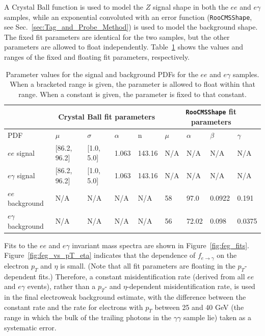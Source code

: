 \documentclass[dissertation.tex]{subfiles}
\begin{document}
A Crystal Ball function is used to model the $Z$ signal shape in both the $ee$ and $e\gamma$ samples, while an exponential convoluted with an error function (\verb+RooCMSShape+, see Sec.~\ref{sec:Tag_and_Probe_Method}) is used to model the background shape.  The fixed fit parameters are identical for the two samples, but the other parameters are allowed to float independently.  Table~\ref{tab:feg_fit_parameters} shows the values and ranges of the fixed and floating fit parameters, respectively.

\begin{table}[hcbp]
\caption{Parameter values for the signal and background PDFs for the $ee$ and $e\gamma$ samples.  When a bracketed range is given, the parameter is allowed to float within that range.  When a constant is given, the parameter is fixed to that constant.}
\centering
\begin{tabular}{|m{1.25cm}|m{1.25cm}|m{1.25cm}|m{1.25cm}|m{1.25cm}|m{1.25cm}|m{1.25cm}|m{1.25cm}|m{1.25cm}|}
\hline
& \multicolumn{4}{c|}{Crystal Ball fit parameters} & \multicolumn{4}{c|}{\texttt{RooCMSShape} fit parameters} \\
\hline
PDF & $\mu$ & $\sigma$ & $\alpha$ & n & $\mu$ & $\alpha$ & $\beta$ & $\gamma$ \\
\hline
$ee$ signal & [86.2, 96.2] & [1.0, 5.0] & 1.063 & 143.16 & N/A & N/A & N/A & N/A \\
\hline
$e\gamma$ signal & [86.2, 96.2] & [1.0, 5.0] & 1.063 & 143.16 & N/A & N/A & N/A & N/A \\
\hline
$ee$ background & N/A & N/A & N/A & N/A & 58 & 97.0 & 0.0922 & 0.191 \\
\hline
$e\gamma$ background & N/A & N/A & N/A & N/A & 56 & 72.02 & 0.098 & 0.0375 \\
\hline
\end{tabular}
\label{tab:feg_fit_parameters}
\end{table}

Fits to the $ee$ and $e\gamma$ invariant mass spectra are shown in Figure~\ref{fig:feg_fits}.  Figure~\ref{fig:feg_vs_pT_eta} indicates that the dependence of $f_{e\rightarrow\gamma}$ on the electron $p_{T}$ and $\eta$ is small.  (Note that all fit parameters are floating in the $p_{T}$-dependent fits.)  Therefore, a constant misidentification rate (derived from all $ee$ and $e\gamma$ events), rather than a $p_{T}$- and $\eta$-dependent misidentification rate, is used in the final electroweak background estimate, with the difference between the constant rate and the rate for electrons with $p_{T}$ between 25 and 40 GeV (the range in which the bulk of the trailing photons in the $\gamma\gamma$ sample lie) taken as a systematic error.
\end{document}
